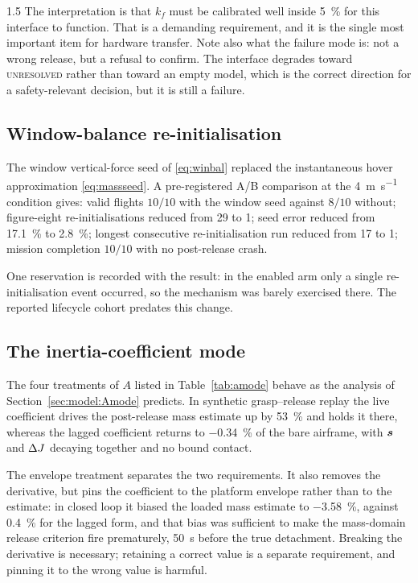 \begin{spacing}{1.5}
The interpretation is that $k_f$ must be calibrated well inside \SI{5}{\percent}
for this interface to function. That is a demanding requirement, and it is the
single most important item for hardware transfer. Note also what the failure mode
is: not a wrong release, but a refusal to confirm. The interface degrades toward
\textsc{unresolved} rather than toward an empty model, which is the correct
direction for a safety-relevant decision, but it is still a failure.

\subsection{Window-balance re-initialisation}\label{sec:eval:seed}

The window vertical-force seed of \eqref{eq:winbal} replaced the instantaneous
hover approximation \eqref{eq:massseed}. A pre-registered A/B comparison at the
\SI{4}{\meter\per\second} condition gives: valid flights $10/10$ with the window
seed against $8/10$ without; figure-eight re-initialisations reduced from 29 to
1; seed error reduced from \SI{17.1}{\percent} to \SI{2.8}{\percent}; longest
consecutive re-initialisation run reduced from 17 to 1; mission completion
$10/10$ with no post-release crash.

One reservation is recorded with the result: in the enabled arm only a single
re-initialisation event occurred, so the mechanism was barely exercised there.
The reported lifecycle cohort predates this change.

\subsection{The inertia-coefficient mode}\label{sec:eval:amode}

The four treatments of $A$ listed in Table~\ref{tab:amode} behave as the analysis
of Section~\ref{sec:model:Amode} predicts. In synthetic grasp--release replay the
live coefficient drives the post-release mass estimate up by \SI{53}{\percent}
and holds it there, whereas the lagged coefficient returns to
\SI{-0.34}{\percent} of the bare airframe, with $\bm{s}$ and $\Delta J$ decaying
together and no bound contact.

The envelope treatment separates the two requirements. It also removes the
derivative, but pins the coefficient to the platform envelope rather than to the
estimate: in closed loop it biased the loaded mass estimate to
\SI{-3.58}{\percent}, against \SI{+0.4}{\percent} for the lagged form, and that
bias was sufficient to make the mass-domain release criterion fire prematurely,
\SI{50}{\second} before the true detachment. Breaking the derivative is
necessary; retaining a correct value is a separate requirement, and pinning it to
the wrong value is harmful.


\end{spacing}
